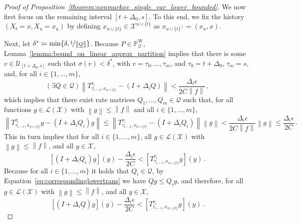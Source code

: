 \documentclass[10pt,a4paper]{paper}
\theoremstyle{definition}
\newcommand{\states}{\mathcal{X}}
\newcommand{\processes}{\mathbb{P}}
\newcommand{\wprocesses}{\processes^{\mathrm{W}}}
\newcommand{\gambles}{\mathcal{L}}
\newcommand{\gamblesX}{\gambles(\states)}
\newcommand{\rateset}{\mathcal{Q}}
\newcommand{\lrate}{\underline{Q}}
\newcommand{\norm}[1]{\left\lVert #1 \right\rVert}
\newcommand{\coloneqq}{:\!=}
\begin{document}
\begin{proof}[Proof of Proposition~\ref{theorem:nonmarkov_single_var_lower_bounded}]
We now first focus on the remaining interval $[t+\Delta_0,s]$. To this end, we fix the history $(X_t=x,X_u=x_u)$ by defining $x_{u\cup\{t\}}\in\states^{u\cup\{t\}}$ as $x_{u\cup\{t\}}\coloneqq (x_u,x)$.

Next, let $\delta^*\coloneqq\min\{\delta,\nicefrac{1}{\norm{\lrate}}\}$. 
Because $P\in\wprocesses_\rateset$, Lemma~\ref{lemma:bound_on_linear_approx_partition} implies that there is some $v\in\mathcal{U}_{[t+\Delta_0,s]}$ such that $\sigma(v)<\delta^*$, with $v=\tau_0,\ldots,\tau_m$, and $\tau_0=t+\Delta_0$, $\tau_m=s$, and, for all $i\in\{1,\ldots,m\}$,
\begin{equation*}
(\exists Q\in\rateset)\norm{T_{\tau_{i-1},x_{u\cup \{t\}}}^{\tau_{i}} - (I+\Delta_{i}Q)} < \frac{\Delta_{i}\epsilon}{2C\norm{f}}\,,
\end{equation*}
which implies that there exist rate matrices $Q_{1},\ldots,Q_{m}\in\rateset$ such that, for all functions $g\in\gamblesX$ with $\norm{g}\leq\norm{f}$ and all $i\in\{1,\ldots,m\}$,
\begin{equation*}
\norm{T_{\tau_{i-1},x_{u\cup\{t\}}}^{\tau_{i}}g - (I+\Delta_{i}Q_i)g} \leq \norm{T_{\tau_{i-1},x_{u\cup\{t\}}}^{\tau_{i}} - (I+\Delta_{i}Q_i)} \norm{g} < \frac{\Delta_{i}\epsilon}{2C\norm{f}}\norm{g} \leq \frac{\Delta_{i}\epsilon}{2C}\,.
\end{equation*}
This in turn implies that for all $i\in\{1,\ldots,m\}$, all $g\in\gamblesX$ with $\norm{g}\leq\norm{f}$, and all $y\in\states$,
\begin{equation*}
\left[(I+\Delta_{i}Q_{i})g\right](y) - \frac{\Delta_{i}\epsilon}{2C} < \left[T_{\tau_{i-1},x_{u\cup\{t\}}}^{\tau_{i}}g\right](y)\,.
\end{equation*}
Because for all $i\in\{1,\ldots,m\}$ it holds that $Q_i\in\rateset$, by Equation~\eqref{eq:correspondinglowertrans} we have $\lrate g\leq Q_ig$, and therefore, for all $g\in\gamblesX$ with $\norm{g}\leq\norm{f}$, and all $y\in\states$,
\begin{equation}\label{eq:lowerbound_proof_linear_approx_lrate}
\left[(I+\Delta_{i}\lrate)g\right](y) - \frac{\Delta_{i}\epsilon}{2C} < \left[T_{\tau_{i-1},x_{u\cup\{t\}}}^{\tau_{i}}g\right](y)\,.
\end{equation}


\end{proof}
\end{document}
